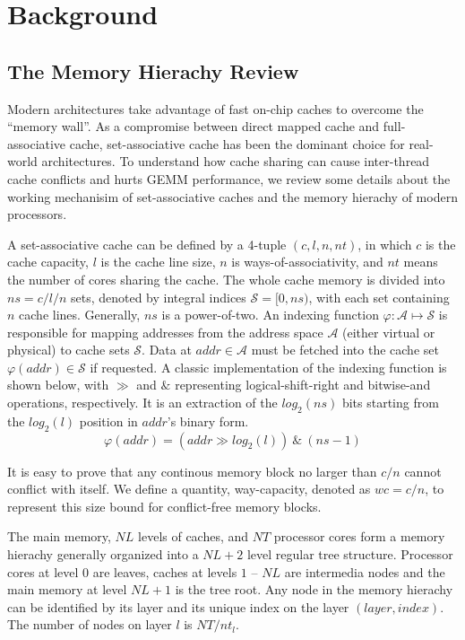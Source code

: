 \section{Background}\label{sec:background}

\subsection{The Memory Hierachy Review}\label{subsec:hierachy}

Modern architectures take advantage of fast on-chip caches
to overcome the ``memory wall''.
As a compromise between direct mapped cache and full-associative cache,
set-associative cache has been the dominant choice for real-world architectures.
To understand how cache sharing can cause inter-thread cache conflicts
and hurts GEMM performance, we review some details
about the working mechanisim of set-associative caches and
the memory hierachy of modern processors.

A set-associative cache can be defined by a 4-tuple $(c, l, n, nt)$,
in which $c$ is the cache capacity, $l$ is the cache line size,
$n$ is ways-of-associativity,
and $nt$ means the number of cores sharing the cache.
The whole cache memory is divided into $ns=c/l/n$ sets,
denoted by integral indices $\mathcal{S} = [0, ns)$,
with each set containing $n$ cache lines.
Generally, $ns$ is a power-of-two.
An indexing function $\varphi: \mathcal{A} \mapsto \mathcal{S}$ is responsible for
mapping addresses from the address space $\mathcal{A}$
(either virtual or physical) to cache sets $\mathcal{S}$.
Data at $addr \in \mathcal{A}$ must be fetched
into the cache set $\varphi(addr) \in \mathcal{S}$ if requested.
A classic implementation of the indexing function is shown below,
with $\gg$ and $\&$ representing logical-shift-right and bitwise-and operations, respectively.
It is an extraction of the $log_2(ns)$ bits starting from the $log_2(l)$
position in $addr$'s binary form.
\begin{equation*}
  \varphi(addr) = (addr \gg log_2(l)) ~\&~ (ns-1)
  \label{eq:phi}
\end{equation*}

It is easy to prove that any continous memory block no larger than $c/n$
cannot conflict with itself.
We define a quantity, way-capacity, denoted as $wc=c/n$,
to represent this size bound for conflict-free memory blocks.

The main memory, $NL$ levels of caches, and $NT$ processor cores
form a memory hierachy generally organized into
a $NL+2$ level regular tree structure.
Processor cores at level $0$ are leaves,
caches at levels $1$ -- $NL$ are intermedia nodes
and the main memory at level $NL+1$ is the tree root.
Any node in the memory hierachy can be identified by
its layer and its unique index on the layer $(layer, index)$.
The number of nodes on layer $l$ is $NT / nt_l$.

